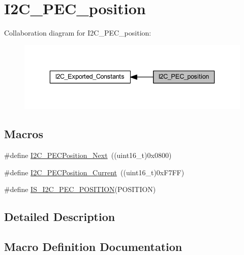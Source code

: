 \hypertarget{group___i2_c___p_e_c__position}{}\section{I2\+C\+\_\+\+P\+E\+C\+\_\+position}
\label{group___i2_c___p_e_c__position}
Collaboration diagram for I2\+C\+\_\+\+P\+E\+C\+\_\+position\+:
\nopagebreak
\begin{figure}[H]
\begin{center}
\leavevmode
\includegraphics[width=336pt]{group___i2_c___p_e_c__position}
\end{center}
\end{figure}
\subsection*{Macros}
\begin{DoxyCompactItemize}
\item 
\#define \hyperlink{group___i2_c___p_e_c__position_ga74d0996efe6e278fb28d053ba78fccc5}{I2\+C\+\_\+\+P\+E\+C\+Position\+\_\+\+Next}~((uint16\+\_\+t)0x0800)
\item 
\#define \hyperlink{group___i2_c___p_e_c__position_ga8a393364dd651f88bcaebac71c1c52c7}{I2\+C\+\_\+\+P\+E\+C\+Position\+\_\+\+Current}~((uint16\+\_\+t)0x\+F7\+F\+F)
\item 
\#define \hyperlink{group___i2_c___p_e_c__position_gac8611a62b06256b1b3c60d4859a016ef}{I\+S\+\_\+\+I2\+C\+\_\+\+P\+E\+C\+\_\+\+P\+O\+S\+I\+T\+I\+ON}(P\+O\+S\+I\+T\+I\+ON)
\end{DoxyCompactItemize}


\subsection{Detailed Description}


\subsection{Macro Definition Documentation}
\mbox{\label{group___i2_c___p_e_c__position_ga8a393364dd651f88bcaebac71c1c52c7}} 
